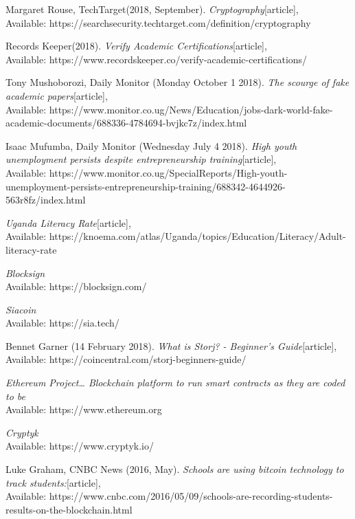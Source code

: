 \begin{thebibliography}{20}

Margaret Rouse, TechTarget(2018, September).
\emph{Cryptography}[article],\\
Available: {https://searchsecurity.techtarget.com/definition/cryptography}

 Records Keeper(2018).
\emph{Verify Academic Certifications}[article],\\
Available: {https://www.recordskeeper.co/verify-academic-certifications/}

 Tony Mushoborozi, Daily Monitor (Monday October 1 2018).
\emph{The scourge of fake academic papers}[article],\\
Available: {https://www.monitor.co.ug/News/Education/jobs-dark-world-fake-academic-documents/688336-4784694-bvjkc7z/index.html}

 Isaac Mufumba, Daily Monitor (Wednesday July 4 2018).
\emph{High youth unemployment persists despite entrepreneurship training}[article],\\
Available: {https://www.monitor.co.ug/SpecialReports/High-youth-unemployment-persists-entrepreneurship-training/688342-4644926-563r8fz/index.html}

\emph{Uganda Literacy Rate}[article],\\
Available: {https://knoema.com/atlas/Uganda/topics/Education/Literacy/Adult-literacy-rate}

\emph{Blocksign}\\
Available: {https://blocksign.com/}

\emph{Siacoin}\\
Available: {https://sia.tech/}

 Bennet Garner (14 February 2018).
\emph{What is Storj? - Beginner’s Guide}[article],\\
Available: {https://coincentral.com/storj-beginners-guide/}

\emph{Ethereum Project… Blockchain platform to run smart contracts as they are coded to be}\\
Available: {https://www.ethereum.org}

\emph{Cryptyk}\\
Available: {https://www.cryptyk.io/}

Luke Graham, CNBC News (2016, May).
\emph{Schools are using bitcoin technology to track students:}[article],\\
Available: {https://www.cnbc.com/2016/05/09/schools-are-recording-students-results-on-the-blockchain.html}


\end{thebibliography}
